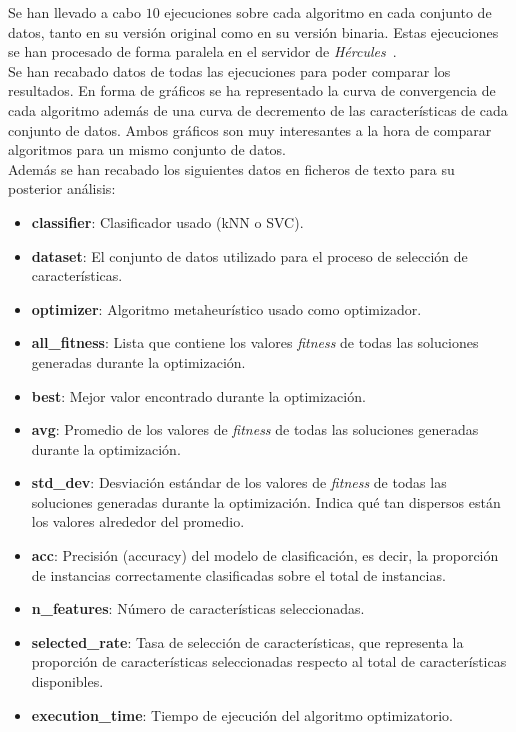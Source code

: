 Se han llevado a cabo $10$ ejecuciones sobre cada algoritmo en cada conjunto de datos, tanto en su versión original como en su versión binaria. Estas ejecuciones se han procesado de forma paralela en el servidor de \textit{Hércules}~\cite{citicugr}.\\[6pt]
Se han recabado datos de todas las ejecuciones para poder comparar los resultados. En forma de gráficos se ha representado la curva de convergencia de cada algoritmo además de una curva de decremento de las características de cada conjunto de datos. Ambos gráficos son muy interesantes a la hora de comparar algoritmos para un mismo conjunto de datos.\\[6pt]
Además se han recabado los siguientes datos en ficheros de texto para su posterior análisis:
\begin{itemize}
    \item \textbf{classifier}: Clasificador usado (kNN o SVC).
    \item \textbf{dataset}: El conjunto de datos utilizado para el proceso de selección de características.
    \item \textbf{optimizer}: Algoritmo metaheurístico usado como optimizador.
    \item \textbf{all\_fitness}: Lista que contiene los valores \textit{fitness} de todas las soluciones generadas durante la optimización.
    \item \textbf{best}: Mejor valor encontrado durante la optimización.
    \item \textbf{avg}: Promedio de los valores de \textit{fitness} de todas las soluciones generadas durante la optimización.
    \item \textbf{std\_dev}: Desviación estándar de los valores de \textit{fitness} de todas las soluciones generadas durante la optimización. Indica qué tan dispersos están los valores alrededor del promedio.
    \item \textbf{acc}: Precisión (accuracy) del modelo de clasificación, es decir, la proporción de instancias correctamente clasificadas sobre el total de instancias.
    \item \textbf{n\_features}: Número de características seleccionadas.
    \item \textbf{selected\_rate}: Tasa de selección de características, que representa la proporción de características seleccionadas respecto al total de características disponibles.
    \item \textbf{execution\_time}: Tiempo de ejecución del algoritmo optimizatorio.
\end{itemize}
